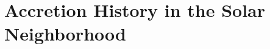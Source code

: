\documentclass[twocolumn,preprintnumbers]{aastex6}
\newcommand{\FeH}{\text{[Fe/H]} }
\def\ML#1{\textcolor{red}{[ML: #1]}}
\begin{document}
%



\section{Accretion History in the Solar Neighborhood}
\label{sec:origins}
\end{document}

